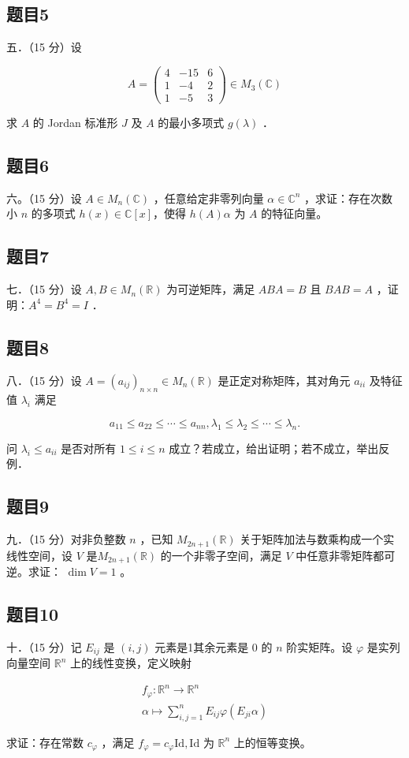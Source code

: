 \documentclass{article}
\begin{document}
\subsection{题目5}
五．（15 分）设

\[
A=\left(\begin{array}{ccc}
4 & -15 & 6 \\
1 & -4 & 2 \\
1 & -5 & 3
\end{array}\right) \in M_{3}(\mathbb{C})
\]

求 \(A\) 的 Jordan 标准形 \(J\) 及 \(A\) 的最小多项式 \(g(\lambda)\) ．

\subsection{题目6}
六。（15 分）设 \(A \in M_{n}(\mathbb{C})\) ，任意给定非零列向量 \(\alpha \in \mathbb{C}^{n}\) ，求证：存在次数小 \(n\) 的多项式 \(h(x) \in \mathbb{C}[x]\)，使得 \(h(A) \alpha\) 为 \(A\) 的特征向量。

\subsection{题目7}
七．（15 分）设 \(A, B \in M_{n}(\mathbb{R})\) 为可逆矩阵，满足 \(A B A=B\) 且 \(B A B=A\) ，证明：\(A^{4}=B^{4}=I\) ．

\subsection{题目8}
八．（15 分）设 \(A=\left(a_{i j}\right)_{n \times n} \in M_{n}(\mathbb{R})\) 是正定对称矩阵，其对角元 \(a_{i i}\) 及特征值 \(\lambda_{i}\) 满足

\[
a_{11} \leq a_{22} \leq \cdots \leq a_{n n}, \lambda_{1} \leq \lambda_{2} \leq \cdots \leq \lambda_{n} .
\]

问 \(\lambda_{i} \leq a_{i i}\) 是否对所有 \(1 \leq i \leq n\) 成立？若成立，给出证明；若不成立，举出反例．

\subsection{题目9}
九．（15 分）对非负整数 \(n\) ，已知 \(M_{2 n+1}(\mathbb{R})\) 关于矩阵加法与数乘构成一个实线性空间，设 \(V\) 是\(M_{2 n+1}(\mathbb{R})\) 的一个非零子空间，满足 \(V\) 中任意非零矩阵都可逆。求证： \(\operatorname{dim} V=1\) 。

\subsection{题目10}
十．（15 分）记 \(E_{i j}\) 是 \((i, j)\) 元素是1其余元素是 0 的 \(n\) 阶实矩阵。设 \(\varphi\) 是实列向量空间 \(\mathbb{R}^{n}\) 上的线性变换，定义映射

\[
\begin{gathered}
f_{\varphi}: \mathbb{R}^{n} \rightarrow \mathbb{R}^{n} \\
\alpha \mapsto \sum_{i, j=1}^{n} E_{i j} \varphi\left(E_{j i} \alpha\right)
\end{gathered}
\]

求证：存在常数 \(c_{\varphi}\) ，满足 \(f_{\varphi}=c_{\varphi} \mathrm{Id}, \mathrm{Id}\) 为 \(\mathbb{R}^{n}\) 上的恒等变换。
\end{document}
